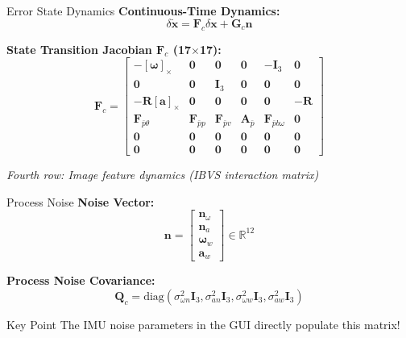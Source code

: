 \documentclass{beamer}
\newcommand{\R}{\mathbf{R}}
\newcommand{\I}{\mathbf{I}}
\renewcommand{\skew}[1]{\left[#1\right]_\times}
\begin{document}
\begin{frame}{Error State Dynamics}
\textbf{Continuous-Time Dynamics:}
\begin{equation*}
    \delta\dot{\mathbf{x}} = \mathbf{F}_c \delta\mathbf{x} + \mathbf{G}_c \mathbf{n}
\end{equation*}

\vspace{0.3cm}
\textbf{State Transition Jacobian $\mathbf{F}_c$ (17$\times$17):}
\begin{equation*}
\mathbf{F}_c = \begin{bmatrix}
    -\skew{\bm{\omega}} & \mathbf{0} & \mathbf{0} & \mathbf{0} & -\I_3 & \mathbf{0} \\
    \mathbf{0} & \mathbf{0} & \I_3 & \mathbf{0} & \mathbf{0} & \mathbf{0} \\
    -\R\skew{\mathbf{a}} & \mathbf{0} & \mathbf{0} & \mathbf{0} & \mathbf{0} & -\R \\
    \mathbf{F}_{\bar{p}\theta} & \mathbf{F}_{\bar{p}p} & \mathbf{F}_{\bar{p}v} & \mathbf{A}_{\bar{p}} & \mathbf{F}_{{\bar{p}}{b\omega}} & \mathbf{0} \\
    \mathbf{0} & \mathbf{0} & \mathbf{0} & \mathbf{0} & \mathbf{0} & \mathbf{0} \\
    \mathbf{0} & \mathbf{0} & \mathbf{0} & \mathbf{0} & \mathbf{0} & \mathbf{0}
\end{bmatrix}
\end{equation*}

\small
\textit{Fourth row: Image feature dynamics (IBVS interaction matrix)}
\end{frame}

\begin{frame}{Process Noise}
\textbf{Noise Vector:}
\begin{equation*}
    \mathbf{n} = \begin{bmatrix} \mathbf{n}_\omega \\ \mathbf{n}_a \\ \bm{\omega}_w \\ \mathbf{a}_w \end{bmatrix} \in \mathbb{R}^{12}
\end{equation*}

\vspace{0.5cm}
\textbf{Process Noise Covariance:}
\begin{equation*}
    \mathbf{Q}_c = \text{diag}\left(\sigma_{\omega n}^2 \I_3, \sigma_{an}^2 \I_3, \sigma_{\omega w}^2 \I_3, \sigma_{aw}^2 \I_3\right)
\end{equation*}

\vspace{0.5cm}
\begin{block}{Key Point}
The IMU noise parameters in the GUI directly populate this matrix!
\end{block}
\end{frame}
\end{document}
